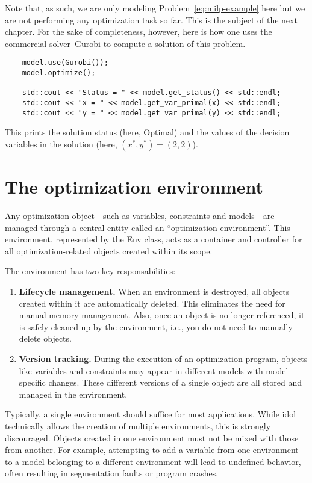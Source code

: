 Note that, as such, we are only modeling Problem~\eqref{eq:milp-example} here
but we are not performing any optimization task so far. This is the subject of
the next chapter. For the sake of completeness, however, here is how one uses
the commercial solver~\textsf{Gurobi} to compute a solution
of this problem.
%
\begin{lstlisting}
    model.use(Gurobi());
    model.optimize();

    std::cout << "Status = " << model.get_status() << std::endl;
    std::cout << "x = " << model.get_var_primal(x) << std::endl;
    std::cout << "y = " << model.get_var_primal(y) << std::endl;
\end{lstlisting}

This prints the solution status (here, \textsf{Optimal}) and the values of the
decision variables in the solution (here, $(x^*,y^*) = (2,2)$). 

\section{The optimization environment}

Any optimization object---such as variables, constraints and models---are
managed through a central entity called an ``optimization environment''.
This environment, represented by the \textsf{Env} class, acts as a container 
and controller for all optimization-related objects created within its scope.

The environment has two key responsabilities:
\begin{enumerate}
    \item \textbf{Lifecycle management.} When an environment is destroyed, all
    objects created within it are automatically deleted. This eliminates the
    need for manual memory management. Also, once an object is no longer
    referenced, it is safely cleaned up by the environment, i.e., you do not
    need to manually delete objects.
    \item \textbf{Version tracking.} During the execution of an optimization
    program, objects like variables and constraints may appear in different
    models with model-specific changes. These different versions of a single
    object are all stored and managed in the environment.  
\end{enumerate}

Typically, a single environment should suffice for most applications. While
\textsf{idol} technically allows the creation of multiple environments, this
is strongly discouraged. Objects created in one environment must not be mixed
with those from another. For example, attempting to add a variable from one
environment to a model belonging to a different environment will lead to
undefined behavior, often resulting in segmentation faults or program crashes.

